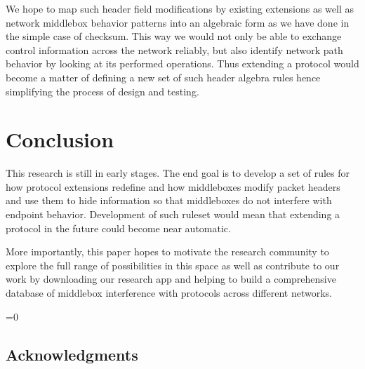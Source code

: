 \documentclass{sig-alternate-10pt}
\def\anon{1}        %
\begin{document}
We hope to map such header field modifications by existing extensions as well as network middlebox behavior patterns into an algebraic form as we have done in the simple case of checksum. This way we would not only be able to exchange control information across the network reliably, but also identify network path behavior by looking at its performed operations. Thus extending a protocol would become a matter of defining a new set of such header algebra rules hence simplifying the process of design and testing.

\section{Conclusion}

This research is still in early stages. The end goal is to develop a set of rules for how protocol extensions redefine and how middleboxes modify packet headers and use them to hide information so that middleboxes do not interfere with endpoint behavior. Development of such ruleset would mean that extending a protocol in the future could become near automatic.

More importantly, this paper hopes to motivate the research community to explore the full range of possibilities in this space as well as contribute to our work by downloading our research app and helping to build a comprehensive database of middlebox interference with protocols across different networks.

\ifnum\anon=0
\subsection*{Acknowledgments}

\fi


{


\small 

}

%
\end{document}
